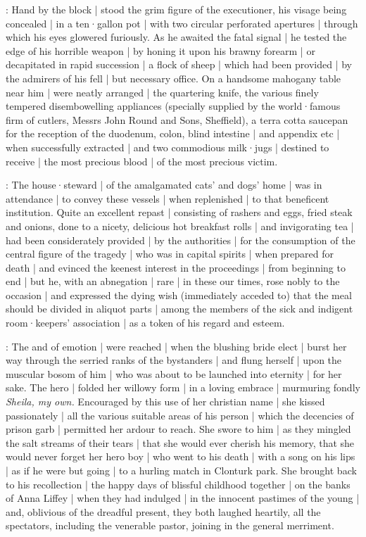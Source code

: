 :
Hand by the block |
stood the grim figure of the executioner,
his visage being concealed |
in a ten·gallon pot |
with two circular perforated apertures |
through which his eyes glowered furiously.
As he awaited the fatal signal |
he tested the edge of his horrible weapon |
by honing it upon his brawny forearm |
or decapitated in rapid succession |
a flock of sheep |
which had been provided |
by the admirers of his fell |
but necessary office.
On a handsome mahogany table near him |
were neatly arranged |
the quartering knife,
the various finely tempered disembowelling appliances
(specially supplied by the world·famous firm of cutlers,
Messrs John Round and Sons,
Sheffield),
a terra cotta saucepan for the reception of the duodenum,
colon,
blind intestine |
and appendix etc |
when successfully extracted |
and two commodious milk·jugs |
destined to receive |
the most precious blood |
of the most precious victim.

:
The house·steward |
of the amalgamated cats' and dogs' home |
was in attendance |
to convey these vessels |
when replenished |
to that beneficent institution.
Quite an excellent repast |
consisting of rashers and eggs,
fried steak and onions,
done to a nicety,
delicious hot breakfast rolls |
and invigorating tea |
had been considerately provided |
by the authorities |
for the consumption of the central figure of the tragedy
 |
who was in capital spirits |
when prepared for death |
and evinced the keenest interest in the proceedings |
from beginning to end |
but he,
with an abnegation |
rare |
in these our times,
rose nobly to the occasion |
and expressed the dying wish
(immediately acceded to)
that the meal should be divided in aliquot parts |
among the members of the sick and indigent room·keepers' association |
as a token of his regard and esteem.

:
The  and  of emotion |
were reached |
when the blushing bride elect |
burst her way through the serried ranks of the bystanders |
and flung herself |
upon the muscular bosom of him |
who was about to be launched into eternity |
for her sake.
The hero |
folded her willowy form |
in a loving embrace |
murmuring fondly
\emph{Sheila,
my own.}
Encouraged by this use of her christian name |
she kissed passionately |
all the various suitable areas of his person |
which the decencies of prison garb |
permitted her ardour to reach.
She swore to him |
as they mingled the salt streams of their tears |
that she would ever cherish his memory,
that she would never forget her hero boy |
who went to his death |
with a song on his lips |
as if he were but going |
to a hurling match in Clonturk park.
She brought back to his recollection |
the happy days of blissful childhood together |
on the banks of Anna Liffey |
when they had indulged |
in the innocent pastimes of the young |
and,
oblivious of the dreadful present,
they both laughed heartily,
all the spectators,
including the venerable pastor,
joining in the general merriment.

